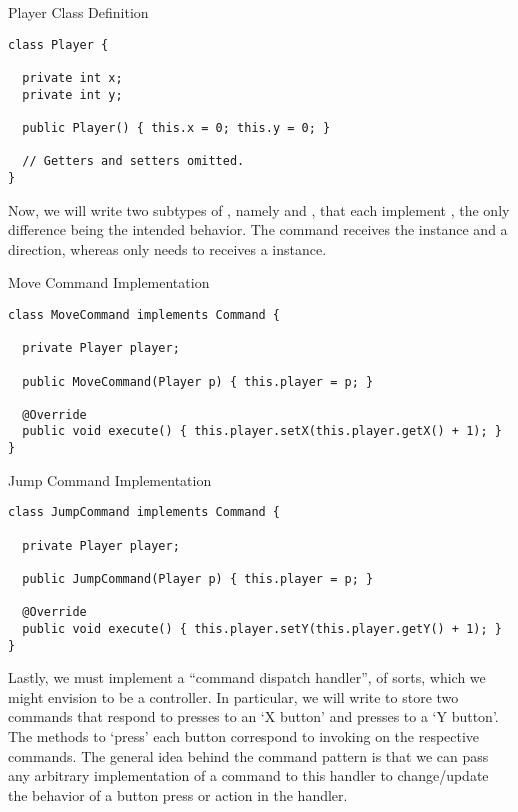 \begin{cl}{Player Class Definition}
\begin{lstlisting}[language=MyJava]
class Player {
  
  private int x;
  private int y;

  public Player() { this.x = 0; this.y = 0; }

  // Getters and setters omitted.
}
\end{lstlisting}
\end{cl}

Now, we will write two subtypes of , namely  and , that each implement , the only difference being the intended behavior. The  command receives the  instance and a direction, whereas  only needs to receives a  instance. 

\begin{cl}{Move Command Implementation}
\begin{lstlisting}[language=MyJava]
class MoveCommand implements Command {

  private Player player;

  public MoveCommand(Player p) { this.player = p; }

  @Override
  public void execute() { this.player.setX(this.player.getX() + 1); }
}
\end{lstlisting}
\end{cl}

\begin{cl}{Jump Command Implementation}
\begin{lstlisting}[language=MyJava]
class JumpCommand implements Command {
  
  private Player player;

  public JumpCommand(Player p) { this.player = p; }

  @Override
  public void execute() { this.player.setY(this.player.getY() + 1); }
}
\end{lstlisting}
\end{cl}

Lastly, we must implement a ``command dispatch handler'', of sorts, which we might envision to be a controller. In particular, we will write  to store two commands that respond to presses to an `X button' and presses to a `Y button'. The methods to `press' each button correspond to invoking  on the respective commands. The general idea behind the command pattern is that we can pass any arbitrary implementation of a command to this handler to change/update the behavior of a button press or action in the handler. 

